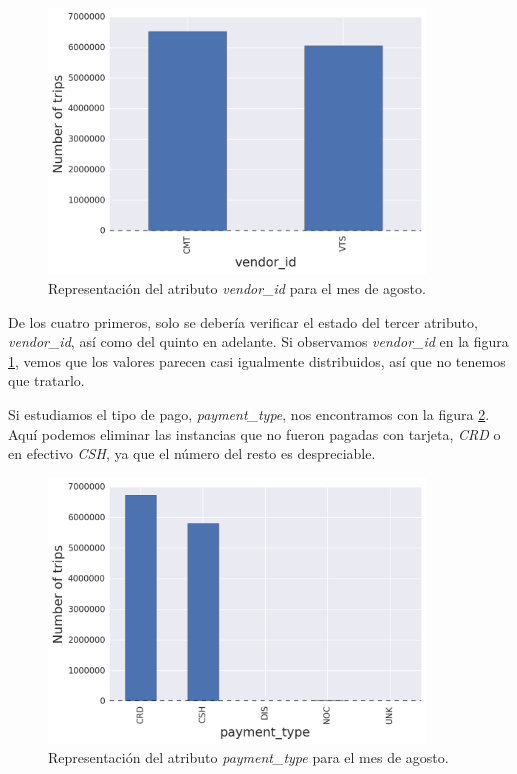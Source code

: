 \begin{figure}[H]
  \centering
  \includegraphics[width=100mm]{figures/ch_05/vendor_id.png}
  \caption{Representación del atributo \emph{vendor\_id} para el mes de agosto.}
  \label{fig:5.2}
\end{figure}

De los cuatro primeros, solo se debería verificar el estado del tercer atributo, \emph{vendor\_id}, así como del quinto en adelante. Si observamos \emph{vendor\_id} en la figura \ref{fig:5.2}, vemos que los valores parecen casi igualmente distribuidos, así que no tenemos que tratarlo.

Si estudiamos el tipo de pago, \emph{payment\_type}, nos encontramos con la figura \ref{fig:5.3}. Aquí podemos eliminar las instancias que no fueron pagadas con tarjeta, \emph{CRD} o en efectivo \emph{CSH}, ya que el número del resto es despreciable.

\begin{figure}[H]
  \centering
  \includegraphics[width=100mm]{figures/ch_05/payment_type_1.png}
  \caption{Representación del atributo \emph{payment\_type} para el mes de agosto.}
  \label{fig:5.3}
\end{figure}

